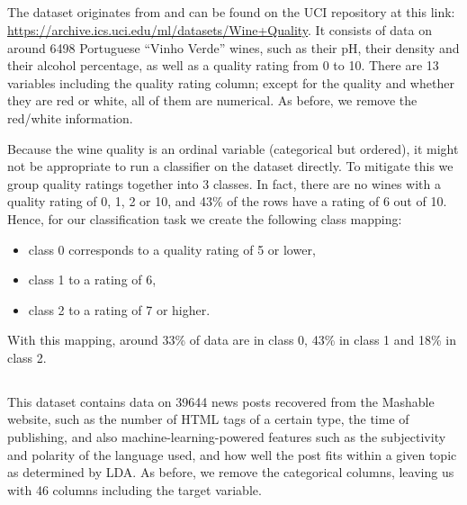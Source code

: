\documentclass[../main.tex]{subfiles}
\begin{document}
\subsection{\WineQuality}

The \WineQuality{} dataset originates from \cite{cortezModeling2009} and can be found on the UCI repository at this link: \url{https://archive.ics.uci.edu/ml/datasets/Wine+Quality}.
It consists of data on around 6498 Portuguese ``Vinho Verde'' wines, such as their pH, their density and their alcohol percentage, as well as a quality rating from 0 to 10.
There are 13 variables including the quality rating column; except for the quality and whether they are red or white, all of them are numerical.
As before, we remove the red/white information.

Because the wine quality is an ordinal variable (categorical but ordered), it might not be appropriate to run a classifier on the dataset directly.
To mitigate this we group quality ratings together into 3 classes.
In fact, there are no wines with a quality rating of 0, 1, 2 or 10, and 43\% of the rows have a rating of 6 out of 10.
Hence, for our classification task we create the following class mapping:
\begin{itemize}
    \item class 0 corresponds to a quality rating of 5 or lower,
    \item class 1 to a rating of 6,
    \item class 2 to a rating of 7 or higher.
\end{itemize}
With this mapping, around 33\% of data are in class 0, 43\% in class 1 and 18\% in class 2.

\subsection{\OnlineNewsPopularity}

This dataset \cite{fernandesProactive2015} contains data on 39644 news posts recovered from the Mashable website, such as the number of HTML tags of a certain type, the time of publishing, and also machine-learning-powered features such as the subjectivity and polarity of the language used, and how well the post fits within a given topic as determined by LDA.
As before, we remove the categorical columns, leaving us with 46 columns including the target variable.
\end{document}
